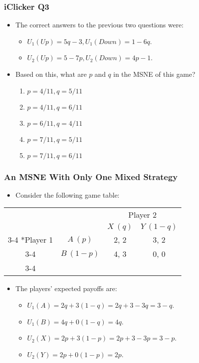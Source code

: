 \begin{frame}
\frametitle{iClicker Q3}
\begin{itemize}
\item The correct answers to the previous two questions were:
\begin{itemize}
\item $U_1(Up) = 5q - 3, U_1(Down) = 1 - 6q$.
\item $U_2(Up) = 5 - 7p, U_2(Down) = 4p - 1$.
\end{itemize}
\item Based on this, what are $p$ and $q$ in the MSNE of this game?
\begin{enumerate}
\item $p = 4/11, q = 5/11$
\item $p = 4/11, q = 6/11$
\item $p = 6/11, q = 4/11$
\item $p = 7/11, q = 5/11$
\item $p = 7/11, q = 6/11$
\end{enumerate}
\end{itemize}
\end{frame}

\begin{frame}
\frametitle{An MSNE With Only One Mixed Strategy}
\begin{itemize}
	\item Consider the following game table:
\end{itemize}
\begin{table}[h]
	\centering
	\begin{tabular}{cc|c|c|}
		& \multicolumn{1}{c}{} & \multicolumn{2}{c}{Player 2}\\
		& \multicolumn{1}{c}{} & \multicolumn{1}{c}{$X~(q)$}  & \multicolumn{1}{c}{$Y~(1 - q)$} \\\cline{3-4}
		\multirow{2}*{Player 1}  & $A~(p)$ & 2, 2 & 3, 2 \\\cline{3-4}
		& $B~(1 - p)$ & 4, 3 & 0, 0 \\\cline{3-4}
	\end{tabular}
\end{table}
\begin{itemize}
	\item The players' expected payoffs are:
	\begin{itemize}
		\item $U_1(A) = 2q + 3(1 - q) = 2q + 3 - 3q = 3 - q$.
		\item $U_1(B) = 4q + 0(1 - q) = 4q$.
		\item $U_2(X) = 2p + 3(1 - p) = 2p + 3 - 3p = 3 - p$.
		\item $U_2(Y) = 2p + 0(1 - p) = 2p$.
	\end{itemize}
\end{itemize}
\end{frame}


